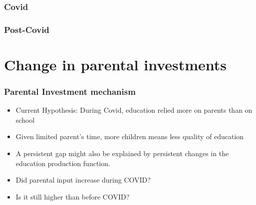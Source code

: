 \documentclass{beamer}
\begin{document}
\begin{frame}
    \label{update_scott}
    \frametitle{Covid}
 {
    }
\end{frame}

\begin{frame}
    \label{update_scott}
    \frametitle{Post-Covid}
 {
    }
\end{frame}


\section{Change in parental investments}


\begin{frame}
    \frametitle{Parental Investment mechanism}
    \begin{itemize}
        \item Current Hypothesis: During Covid, education relied more on parents than on school
        \item Given limited parent's time, more children means less quality of education
        \item A persistent gap might also be explained by persistent changes in the education production function. 
        \item Did parental input increase during COVID? 
        \item Is it still higher than before COVID?
    \end{itemize}
\end{frame}
\end{document}

